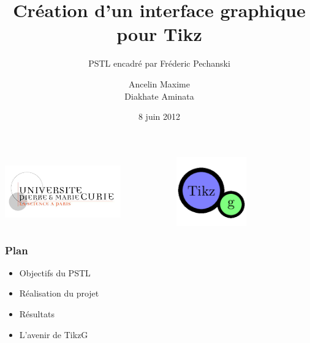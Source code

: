 \documentclass{beamer}
\title[Création d'un interface graphique pour Tikz]{Création d'un interface graphique pour Tikz}
\subtitle{PSTL encadré par Fréderic Pechanski}    %
\author[]{Ancelin Maxime\\Diakhate Aminata}                 %
\institute[UPMC]{M1 Informatique spécialité STL\\UPMC}      %
\date{8 juin 2012}      %
\begin{document}
\newenvironment{violetpar}{\color{violet}}{}
\newenvironment{bluepar}{\par\color{blue}}{\par}
\newenvironment{yellowpar}{\par\color{orange}}{\par}





\begin{frame}
  \titlepage
\includegraphics[width=5cm, height=3cm]{img/LogoUPMC.jpg} \   \ \ \ \ \ \ 
\includegraphics[width=5cm, height=3cm]{img/logo256.png} 
\end{frame}

\begin{frame}
\frametitle{Plan} 

\begin{itemize}

\item Objectifs du PSTL

\item Réalisation du projet

\item Résultats

\item L'avenir de TikzG

%


\end{itemize}
\end{frame}
\end{document}
